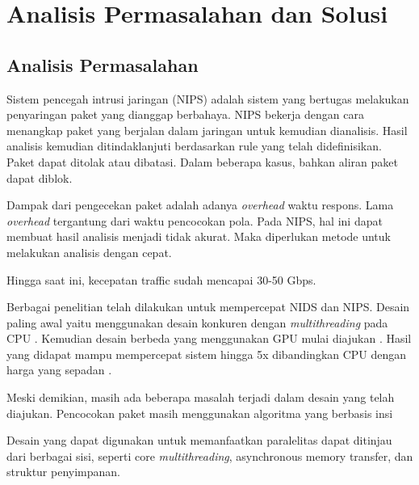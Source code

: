 \chapter{Analisis Permasalahan dan Solusi}


  \section{Analisis Permasalahan}
  
    Sistem pencegah intrusi jaringan (NIPS) adalah sistem yang bertugas melakukan penyaringan paket yang dianggap berbahaya. NIPS bekerja dengan cara menangkap paket yang berjalan dalam jaringan untuk kemudian dianalisis. Hasil analisis kemudian ditindaklanjuti berdasarkan rule yang telah didefinisikan. Paket dapat ditolak atau dibatasi. Dalam beberapa kasus, bahkan aliran paket dapat diblok.

    Dampak dari pengecekan paket adalah adanya \emph{overhead} waktu respons. Lama \emph{overhead} tergantung dari waktu pencocokan pola. Pada NIPS, hal ini dapat membuat hasil analisis menjadi tidak akurat. Maka diperlukan metode untuk melakukan analisis dengan cepat.

    Hingga saat ini, kecepatan traffic sudah mencapai 30-50 Gbps.

    Berbagai penelitian telah dilakukan untuk mempercepat NIDS dan NIPS. Desain paling awal yaitu menggunakan desain konkuren dengan \emph{multithreading} pada CPU \parencite{multi2004}. Kemudian desain berbeda yang menggunakan GPU mulai diajukan \parencite{gnort2008}. Hasil yang didapat mampu mempercepat sistem hingga 5x dibandingkan CPU dengan harga yang sepadan \parencite{smith2009}.


    Meski demikian, masih ada beberapa masalah terjadi dalam desain yang telah diajukan. Pencocokan paket masih menggunakan algoritma yang berbasis insi

    Desain yang dapat digunakan untuk memanfaatkan paralelitas dapat ditinjau dari berbagai sisi, seperti core \emph{multithreading}, asynchronous memory transfer, dan struktur penyimpanan.

